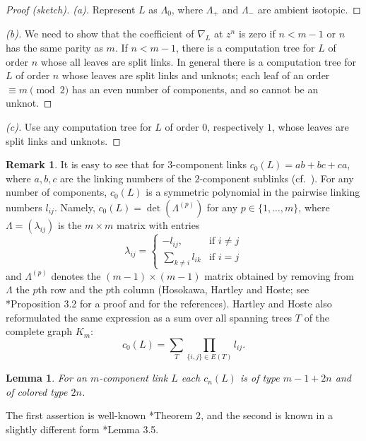 \documentclass[a4paper,12pt,reqno,oneside]{amsart} %
\theoremstyle{plain}
\newtheorem{lemma}[theorem]{Lemma}
\theoremstyle{definition}
\newtheorem{remark}[theorem]{Remark}
\theoremstyle{named}
\def\x{\times}
\renewcommand{\:}{\colon}
\begin{document}
\begin{proof}[Proof (sketch). (a)] Represent $L$ as $\Lambda_0$, where $\Lambda_+$ and $\Lambda_-$ are ambient isotopic.
\end{proof}

\begin{proof}[(b)] We need to show that the coefficient of $\nabla_L$ at $z^n$ is zero if $n<m-1$ or $n$ has the same parity as $m$.
If $n<m-1$, there is a computation tree for $L$ of order $n$ whose all leaves are split links.
In general there is a computation tree for $L$ of order $n$ whose leaves are split links and unknots; each leaf of an order $\equiv m\pmod 2$
has an even number of components, and so cannot be an unknot.
\end{proof}

\begin{proof}[(c)] Use any computation tree for $L$ of order $0$, respectively $1$, whose leaves are split links and unknots.
\end{proof}

\begin{remark} \label{hhh}
It is easy to see that for $3$-component links $c_0(L)=ab+bc+ca$, where $a,b,c$ are the linking numbers
of the $2$-component sublinks (cf.\ \cite{Liv}).
For any number of components, $c_0(L)$ is a symmetric polynomial in the pairwise linking numbers $l_{ij}$.
Namely, $c_0(L)=\det(\Lambda^{(p)})$ for any $p\in\{1,\dots,m\}$, where $\Lambda=(\lambda_{ij})$ is 
the $m\x m$ matrix with entries
\[\lambda_{ij}=\begin{cases}-l_{ij},&\text{if }i\ne j\\
\sum_{k\ne i}l_{ik}&\text{if }i=j
\end{cases}\] and $\Lambda^{(p)}$ denotes the $(m-1)\x(m-1)$ matrix obtained by removing from $\Lambda$
the $p$th row and the $p$th column (Hosokawa, Hartley and Hoste; see \cite{Le}*{Proposition 3.2} for a proof 
and \cite{Masb} for the references).
Hartley and Hoste also reformulated the same expression as a sum over all spanning trees $T$ of the 
complete graph $K_m$: \[c_0(L)=\sum_T\prod_{\{i,j\}\in E(T)}l_{ij}.\]
\end{remark}

\begin{lemma} \label{conway-coefficients}
For an $m$-component link $L$ each $c_n(L)$ is of type $m-1+2n$ and of colored type $2n$.
\end{lemma}

The first assertion is well-known \cite{BN}*{Theorem 2}, and the second is known in a slightly different form
\cite{ShYa}*{Lemma 3.5}.
\end{document}

